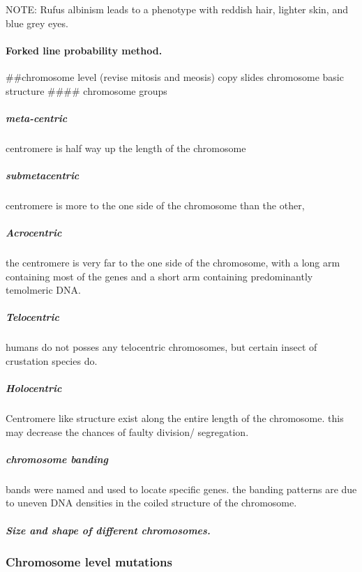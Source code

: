 \documentclass[]{article}
\let\oldparagraph\paragraph
\renewcommand{\paragraph}[1]{\oldparagraph{#1}\mbox{}}
\let\oldsubparagraph\subparagraph
\renewcommand{\subparagraph}[1]{\oldsubparagraph{#1}\mbox{}}
\begin{document}
NOTE: Rufus albinism leads to a phenotype with reddish hair, lighter
skin, and blue grey eyes.

\hypertarget{forked-line-probability-method.}{%
\paragraph{Forked line probability
method.}\label{forked-line-probability-method.}}

\#\#chromosome level (revise mitosis and meosis) copy slides chromosome
basic structure \#\#\#\# chromosome groups

\hypertarget{meta-centric}{%
\subparagraph{meta-centric}\label{meta-centric}}

centromere is half way up the length of the chromosome

\hypertarget{submetacentric}{%
\subparagraph{submetacentric}\label{submetacentric}}

centromere is more to the one side of the chromosome than the other,

\hypertarget{acrocentric}{%
\subparagraph{Acrocentric}\label{acrocentric}}

the centromere is very far to the one side of the chromosome, with a
long arm containing most of the genes and a short arm containing
predominantly temolmeric DNA.

\hypertarget{telocentric}{%
\subparagraph{Telocentric}\label{telocentric}}

humans do not posses any telocentric chromosomes, but certain insect of
crustation species do.

\hypertarget{holocentric}{%
\subparagraph{Holocentric}\label{holocentric}}

Centromere like structure exist along the entire length of the
chromosome. this may decrease the chances of faulty division/
segregation.

\hypertarget{chromosome-banding}{%
\subparagraph{chromosome banding}\label{chromosome-banding}}

bands were named and used to locate specific genes. the banding patterns
are due to uneven DNA densities in the coiled structure of the
chromosome.

\hypertarget{size-and-shape-of-different-chromosomes.}{%
\subparagraph{Size and shape of different
chromosomes.}\label{size-and-shape-of-different-chromosomes.}}

\hypertarget{chromosome-level-mutations}{%
\subsubsection{Chromosome level
mutations}\label{chromosome-level-mutations}}
\end{document}
